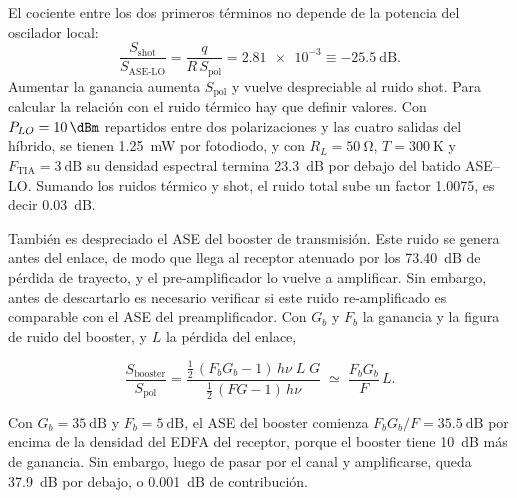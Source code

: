\begin{puntos}

El cociente entre los dos primeros t\'erminos no depende de la potencia del
oscilador local:
\begin{equation}
  \frac{S_{\mathrm{shot}}}{S_{\mathrm{ASE\text{-}LO}}}
    = \frac{q}{R\,S_{\mathrm{pol}}}
    = \num{2.81e-3} \equiv \SI{-25.5}{\dB}.
  \label{eq:shot-vs-ase}
\end{equation}
Aumentar la ganancia aumenta $S_{\mathrm{pol}}$ y vuelve despreciable al ruido
shot. Para calcular la relaci\'on con el ruido t\'ermico hay que
definir valores. Con $P_{LO} = \SI{10}{\dBm}$ repartidos entre dos
polarizaciones y las cuatro salidas del h\'ibrido, se tienen \SI{1.25}{\milli\watt} por
fotodiodo, y con $R_L = \SI{50}{\ohm}$, $T = \SI{300}{\kelvin}$ y
$F_{\mathrm{TIA}} = \SI{3}{\dB}$ su densidad espectral termina \SI{23.3}{\dB} por debajo del batido
ASE--LO. Sumando los ruidos t\'ermico y shot, el ruido total sube un factor \num{1.0075}, es decir
\SI{0.03}{\dB}.


Tambi\'en es despreciado el ASE del booster de transmisi\'on. Este ruido se genera
antes del enlace, de modo que llega al receptor atenuado por los
\SI{73.40}{\dB} de p\'erdida de trayecto, y el pre-amplificador lo vuelve a
amplificar. Sin embargo, antes de descartarlo es necesario verificar si este ruido re-amplificado es comparable con el ASE del preamplificador. Con $G_b$ y $F_b$ la ganancia y
la figura de ruido del booster, y $L$ la p\'erdida del enlace,

\begin{equation}
  \frac{S_{\mathrm{booster}}}{S_{\mathrm{pol}}}
    = \frac{\tfrac12\,(F_bG_b-1)\,h\nu\;L\;G}{\tfrac12\,(FG-1)\,h\nu}
    \;\simeq\; \frac{F_b G_b}{F}\,L .
  \label{eq:ase-booster}
\end{equation}

Con $G_b = \SI{35}{\dB}$ y $F_b = \SI{5}{\dB}$, el
ASE del booster comienza $F_bG_b/F = \SI{35.5}{\dB}$ por encima de la densidad del EDFA del receptor,
porque el booster tiene \SI{10}{\dB} m\'as de ganancia. Sin embargo, luego de pasar por el canal y amplificarse, queda \SI{37.9}{\dB} por
debajo, o \SI{0.001}{\dB} de contribuci\'on.



\end{puntos}

